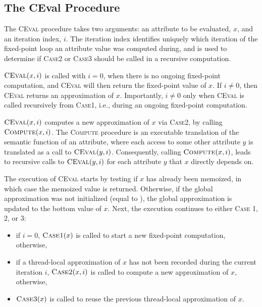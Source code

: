 {{
}

\subsection{The CEval Procedure}

The \textsc{CEval} procedure takes two arguments: an attribute to be evaluated,
$x$, and an iteration index, $i$. The iteration index identifies uniquely which
iteration of the fixed-point loop an attribute value was computed during, and
is used to determine if \textsc{Case2} or \textsc{Case3} should be called in a
recursive computation.

$\textsc{CEval}(x, i)$ is called with $i = 0$, when there is no ongoing fixed-point computation, and
\textsc{CEval} will then return
the fixed-point value of $x$.
If $i \ne 0$, then \textsc{CEval} returns an approximation of $x$.
Importantly, $i \ne 0$ only when \textsc{CEval} is called recursively from \textsc{Case1}, i.e.,
during an ongoing fixed-point computation.

$\textsc{CEval}(x, i)$ computes a new approximation of $x$ via \textsc{Case2}, by calling
$\textsc{Compute}(x, i)$.
The \textsc{Compute} procedure is an executable translation
of the semantic function of an attribute,
where each access to some other attribute $y$ is translated as a call to $\textsc{CEval}(y, i)$.
Consequently, calling $\textsc{Compute}(x, i)$, 
leads to recursive calls to $\textsc{CEval}(y, i)$ for each attribute $y$
that $x$ directly depends on.

The execution of \textsc{CEval} starts by testing if $x$ has already been memoized, in which
case the memoized value is returned.
Otherwise, if the global approximation was not initialized (equal to \none),
the global approximation is updated to the bottom value of $x$.
Next, the execution continues to either \textsc{Case} 1, 2, or 3:
\begin{itemize}
  \item
    if $i = 0$,
    $\textsc{Case1}(x)$ is called to start a new fixed-point computation,
    otherwise,
  \item
    if a thread-local approximation of $x$
    has not been recorded during the current iteration $i$,
    $\textsc{Case2}(x, i)$ is called to compute a new approximation of $x$,
    otherwise,
  \item
    $\textsc{Case3}(x)$ is called to reuse the previous thread-local approximation of $x$.
\end{itemize}



}
